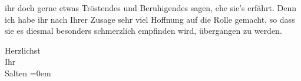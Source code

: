                ihr doch gerne etwas Tröstendes und Beruhigendes sagen, ehe sie’s erfährt. Denn ich
               habe ihr nach Ihrer Zusage sehr viel Hoffnung auf die Rolle gemacht, so dass  sie es diesmal besonders schmerzlich empfinden wird,
               übergangen zu werden.\pend
           
\pstart
           Herzlichst {\\[\baselineskip]}Ihr {\\[\baselineskip]}\spacefill\mbox{Salten}\pend
           \leftskip=0em{}\endnumbering{}  \newcommand{\dateiname}{L03284}\newcommand{\titel}{Felix Salten an Arthur Schnitzler, 23. 9. 1898}\newcommand{\editorInnen}{Martin Anton Müller und Laura Untner}
